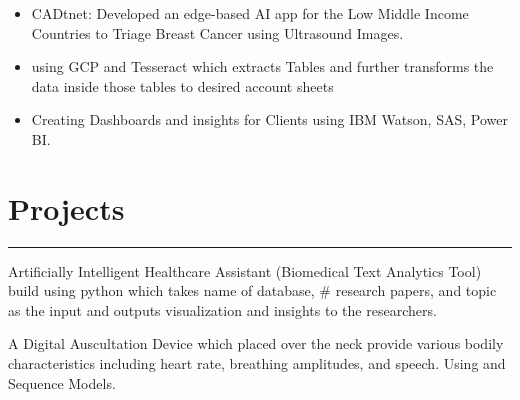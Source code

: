 \documentclass[]{rahulworld-resume}
\begin{document}
\begin{minipage}[t]{0.66\textwidth}
 
\hspace{5em}
\begin{minipage}{1.00\textwidth\vspace{2pt}}
\begin{itemize}
  \setlength{\itemsep}{0.2pt}
  \item {}CADtnet: Developed an edge-based AI app for the Low Middle Income Countries to Triage Breast Cancer using Ultrasound Images.
  \item {}using GCP and Tesseract which extracts Tables and further transforms the data inside those tables to desired account sheets
  \item Creating Dashboards and insights for Clients using IBM Watson, SAS, Power BI.
\end{itemize}
\end{minipage}
\sectionsep

\section{Projects}
\noindent\rule{12.5cm}{0.4pt}   
\noindent
\hspace{1em}%
\begin{minipage}{0.95\textwidth\vspace{5pt}}
Artificially Intelligent Healthcare Assistant (Biomedical Text Analytics Tool) build using python which takes name of database, # research papers, and topic as the input and outputs visualization and insights to the researchers.
\end{minipage}


\noindent
\hspace{1em}%
\begin{minipage}{0.95\textwidth\vspace{5pt}}
A Digital Auscultation Device which placed over the neck provide various bodily characteristics including heart rate, breathing amplitudes, and speech. Using  and Sequence Models.
\end{minipage}


\end{minipage}
\end{document}
